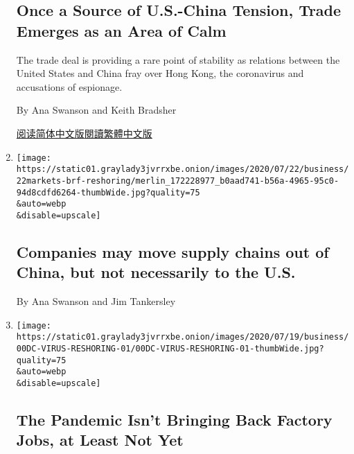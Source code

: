 \begin{enumerate}
  \hypertarget{once-a-source-of-us-china-tension-trade-emerges-as-an-area-of-calm}{%
  \subsection{Once a Source of U.S.-China Tension, Trade Emerges as an
  Area of
  Calm}\label{once-a-source-of-us-china-tension-trade-emerges-as-an-area-of-calm}}

  The trade deal is providing a rare point of stability as relations
  between the United States and China fray over Hong Kong, the
  coronavirus and accusations of espionage.

  By Ana Swanson and Keith Bradsher

  \href{https://cn.nytimes3xbfgragh.onion/business/20200727/us-china-trade-diplomacy/}{阅读简体中文版}\href{https://cn.nytimes3xbfgragh.onion/business/20200727/us-china-trade-diplomacy/zh-hant/}{閱讀繁體中文版}
\item
  \href{/2020/07/22/business/companies-may-move-supply-chains-out-of-china-but-not-necessarily-to-the-us.html}{}

  \texttt{[image: https://static01.graylady3jvrrxbe.onion/images/2020/07/22/business/22markets-brf-reshoring/merlin\_172228977\_b0aad741-b56a-4965-95c0-94d8cdfd6264-thumbWide.jpg?quality=75\\\&auto=webp\\\&disable=upscale]}

  \hypertarget{companies-may-move-supply-chains-out-of-china-but-not-necessarily-to-the-us}{%
  \subsection{Companies may move supply chains out of China, but not
  necessarily to the
  U.S.}\label{companies-may-move-supply-chains-out-of-china-but-not-necessarily-to-the-us}}

  By Ana Swanson and Jim Tankersley
\item
  \href{/2020/07/22/business/economy/coronavirus-globalization-jobs-supply-chain-china.html}{}

  \texttt{[image: https://static01.graylady3jvrrxbe.onion/images/2020/07/19/business/00DC-VIRUS-RESHORING-01/00DC-VIRUS-RESHORING-01-thumbWide.jpg?quality=75\\\&auto=webp\\\&disable=upscale]}

  \hypertarget{the-pandemic-isnt-bringing-back-factory-jobs-at-least-not-yet}{%
  \subsection{The Pandemic Isn't Bringing Back Factory Jobs, at Least
  Not
  Yet}\label{the-pandemic-isnt-bringing-back-factory-jobs-at-least-not-yet}}


\end{enumerate}
